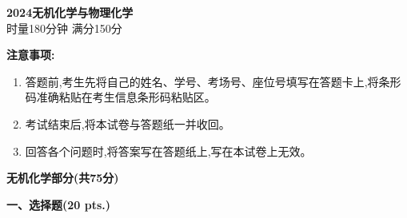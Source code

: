 \begin{center}
    {\LARGE \textbf{2024无机化学与物理化学}} \\[2ex]
    {\large 时量180分钟 \quad 满分150分}
\end{center}

\vspace{0.5cm}
\noindent\textbf{注意事项:}
\begin{enumerate}[label=\arabic*., parsep=0pt, itemsep=0pt]
    \item 答题前,考生先将自己的姓名、学号、考场号、座位号填写在答题卡上,将条形码准确粘贴在考生信息条形码粘贴区。
    \item 考试结束后,将本试卷与答题纸一并收回。
    \item 回答各个问题时,将答案写在答题纸上,写在本试卷上无效。
\end{enumerate}

\vspace{1cm}
\begin{center}
    {\Large \textbf{无机化学部分(共75分)}}
\end{center}

\vspace{0.5cm}
\noindent\textbf{一、选择题(20 pts.)}

